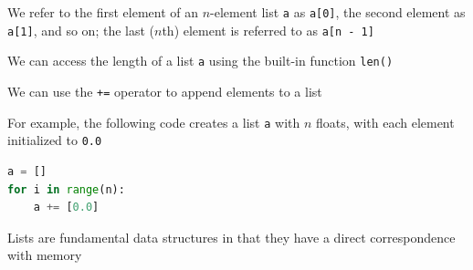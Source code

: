 \documentclass[8pt,a4paper,compress]{beamer}
\begin{document}
\begin{frame}[fragile]
\pause

We refer to the first element of an $n$-element list \lstinline{a} as \lstinline{a[0]}, the second element as \lstinline{a[1]}, and so on; the last ($n$th) element is referred to as \lstinline{a[n - 1]}

\pause
\bigskip

We can access the length of a list \lstinline{a} using the built-in function \lstinline{len()}

\pause
\bigskip

We can use the \lstinline{+=} operator to append elements to a list

\pause
\bigskip

For example, the following code creates a list \lstinline{a} with $n$ floats, with each element initialized to \lstinline{0.0}

\begin{lstlisting}[language=Python]
a = []
for i in range(n):
    a += [0.0]
\end{lstlisting} 

\pause
\bigskip

Lists are fundamental data structures in that they have a direct correspondence with memory

\begin{center}
\end{center}
\end{frame}
\end{document}
